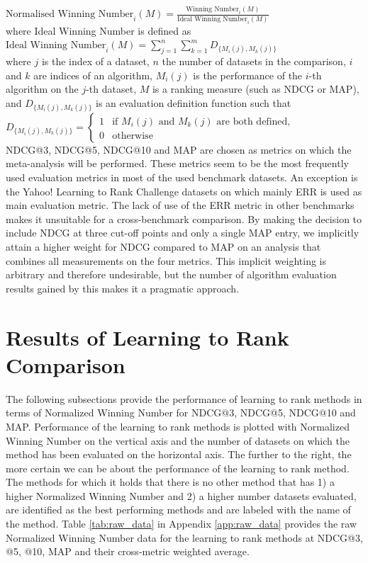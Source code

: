 \documentclass{sig-alternate-2013}
\begin{document}
$\text{Normalised Winning Number}_i(M) = \frac{\text{Winning Number}_i(M)}{\text{Ideal Winning Number}_i(M)}$\\

\noindent
where Ideal Winning Number is defined as\\

$\text{Ideal Winning Number}_i(M) = \sum\nolimits_{j=1}^n \sum\nolimits_{k=1}^m D_{\{M_i(j),M_k(j)\}}$\\

where $j$ is the index of a dataset, $n$ the number of datasets in the comparison, $i$ and $k$ are indices of an algorithm, $M_i(j)$ is the performance of the $i$-th algorithm on the $j$-th dataset, $M$ is a ranking measure (such as NDCG or MAP), and $D_{\{M_i(j),M_k(j)\}}$ is an evaluation definition function such that\\

$D_{\{M_i(j),M_k(j)\}} = \begin{cases}
1 & \text{if } M_i(j) \text{ and } M_k(j) \text{ are both defined}, \\
0 & \text{otherwise}
\end{cases}$\\

NDCG@3, NDCG@5, NDCG@10 and MAP are chosen as metrics on which the meta-analysis will be performed. These metrics seem to be the most frequently used evaluation metrics in most of the used benchmark datasets. An exception is the Yahoo! Learning to Rank Challenge datasets on which mainly ERR is used as main evaluation metric. The lack of use of the ERR metric in other benchmarks makes it unsuitable for a cross-benchmark comparison. By making the decision to include NDCG at three cut-off points and only a single MAP entry, we implicitly attain a higher weight for NDCG compared to MAP on an analysis that combines all measurements on the four metrics. This implicit weighting is arbitrary and therefore undesirable, but the number of algorithm evaluation results gained by this makes it a pragmatic approach.

\section{Results of Learning to Rank Comparison}
The following subsections provide the performance of learning to rank methods in terms of Normalized Winning Number for NDCG@3, NDCG@5, NDCG@10 and MAP. Performance of the learning to rank methods is plotted with Normalized Winning Number on the vertical axis and the number of datasets on which the method has been evaluated on the horizontal axis. The further to the right, the more certain we can be about the performance of the learning to rank method. The methods for which it holds that there is no other method that has 1) a higher Normalized Winning Number and 2) a higher number datasets evaluated, are identified as the best performing methods and are labeled with the name of the method. Table \ref{tab:raw_data} in Appendix \ref{app:raw_data} provides the raw Normalized Winning Number data for the learning to rank methods at NDCG@3, @5, @10, MAP and their cross-metric weighted average.
\end{document}
